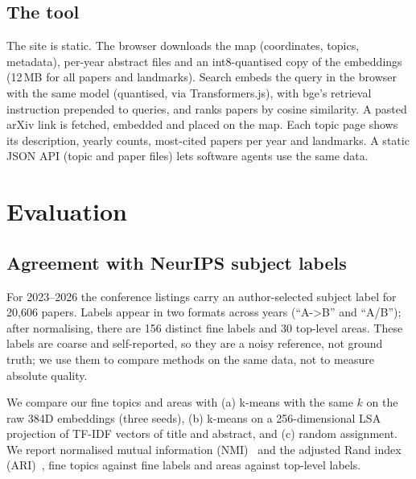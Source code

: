 \documentclass{article}
\begin{document}
\subsection{The tool}
The site is static. The browser downloads the map (coordinates, topics, metadata), per-year abstract files and an int8-quantised copy of the embeddings (12\,MB for all papers and landmarks). Search embeds the query in the browser with the same model (quantised, via Transformers.js), with bge's retrieval instruction prepended to queries, and ranks papers by cosine similarity. A pasted arXiv link is fetched, embedded and placed on the map. Each topic page shows its description, yearly counts, most-cited papers per year and landmarks. A static JSON API (topic and paper files) lets software agents use the same data.

\FloatBarrier
\section{Evaluation}
\subsection{Agreement with NeurIPS subject labels}
For 2023--2026 the conference listings carry an author-selected subject label for 20{,}606 papers. Labels appear in two formats across years (``A->B'' and ``A/B''); after normalising, there are 156 distinct fine labels and 30 top-level areas. These labels are coarse and self-reported, so they are a noisy reference, not ground truth; we use them to compare methods on the same data, not to measure absolute quality.

We compare our fine topics and areas with (a) k-means with the same $k$ on the raw 384D embeddings (three seeds), (b) k-means on a 256-dimensional LSA projection of TF-IDF vectors of title and abstract, and (c) random assignment. We report normalised mutual information (NMI)~\cite{strehl2002cluster} and the adjusted Rand index (ARI)~\cite{hubert1985ari}, fine topics against fine labels and areas against top-level labels.
\end{document}
